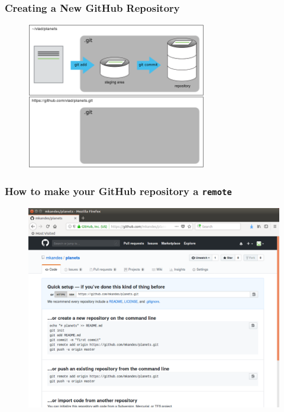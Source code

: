 \documentclass{beamer}
\begin{document}
\begin{frame}
   \frametitle{Creating a New GitHub Repository}
   \begin{figure}[htbp]
      \includegraphics[width=0.7\textwidth]{images/git-freshly-made-github-repo.png}
   \end{figure}
\end{frame}

\begin{frame}
   \frametitle{How to make your GitHub repository a \texttt{remote}}
   \begin{figure}[htbp]
      \includegraphics[width=1.0\textwidth]{images/github-how-to-setup-new-repo.png}
   \end{figure}
\end{frame}
\end{document}
